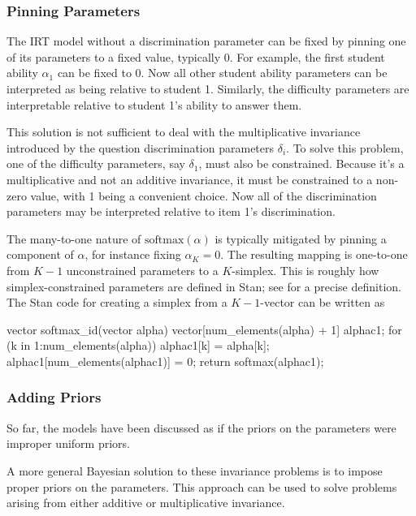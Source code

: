 \subsubsection{Pinning Parameters}

The IRT model without a discrimination parameter can be fixed by
pinning one of its parameters to a fixed value, typically 0.  For
example, the first student ability $\alpha_1$ can be fixed to 0.  Now
all other student ability parameters can be interpreted as being
relative to student 1.  Similarly, the difficulty parameters are
interpretable relative to student 1's ability to answer them.

This solution is not sufficient to deal with the multiplicative
invariance introduced by the question discrimination parameters
$\delta_i$.  To solve this problem, one of the difficulty parameters,
say $\delta_1$, must also be constrained.  Because it's a
multiplicative and not an additive invariance, it must be constrained
to a non-zero value, with 1 being a convenient choice.  Now all of the
discrimination parameters may be interpreted relative to item 1's
discrimination.

The many-to-one nature of $\mbox{softmax}(\alpha)$ is typically
mitigated by pinning a component of $\alpha$, for instance fixing
$\alpha_K = 0$.  The resulting mapping is one-to-one from $K-1$
unconstrained parameters to a $K$-simplex.  This is roughly how
simplex-constrained parameters are defined in Stan; see
 for a precise definition.  The Stan
code for creating a simplex from a $K-1$-vector can be written as
%
\begin{stancode}
vector softmax_id(vector alpha) {
  vector[num_elements(alpha) + 1] alphac1;
  for (k in 1:num_elements(alpha))
    alphac1[k] = alpha[k];
  alphac1[num_elements(alphac1)] = 0;
  return softmax(alphac1);
}
\end{stancode}




\subsubsection{Adding Priors}

So far, the models have been discussed as if the priors on the
parameters were improper uniform priors.

A more general Bayesian solution to these invariance problems is to
impose proper priors on the parameters.  This approach can be used to
solve problems arising from either additive or multiplicative
invariance.


